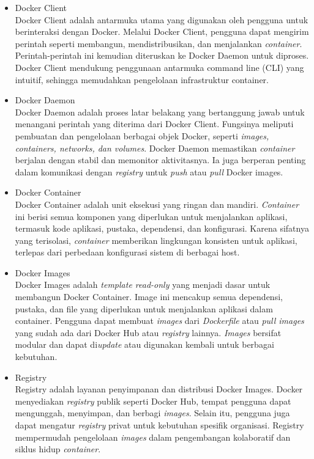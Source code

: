 \begin{itemize}[noitemsep, topsep=0pt]
\item Docker Client \\
Docker Client adalah antarmuka utama yang digunakan oleh pengguna untuk berinteraksi dengan Docker. Melalui Docker Client, pengguna dapat mengirim perintah seperti membangun, mendistribusikan, dan menjalankan \emph{container}. Perintah-perintah ini kemudian diteruskan ke Docker Daemon untuk diproses. Docker Client mendukung penggunaan antarmuka command line (CLI) yang intuitif, sehingga memudahkan pengelolaan infrastruktur container.

\item Docker Daemon \\
Docker Daemon adalah proses latar belakang yang bertanggung jawab untuk menangani perintah yang diterima dari Docker Client. Fungsinya meliputi pembuatan dan pengelolaan berbagai objek Docker, seperti \emph{images, containers, networks, dan volumes}. Docker Daemon memastikan \emph{container} berjalan dengan stabil dan memonitor aktivitasnya. Ia juga berperan penting dalam komunikasi dengan \emph{registry} untuk \emph{push} atau \emph{pull} Docker images.

\item Docker Container \\
Docker Container adalah unit eksekusi yang ringan dan mandiri. \emph{Container} ini berisi semua komponen yang diperlukan untuk menjalankan aplikasi, termasuk kode aplikasi, pustaka, dependensi, dan konfigurasi. Karena sifatnya yang terisolasi, \emph{container} memberikan lingkungan konsisten untuk aplikasi, terlepas dari perbedaan konfigurasi sistem di berbagai host.

\item Docker Images \\
Docker Images adalah \emph{template read-only} yang menjadi dasar untuk membangun Docker Container. Image ini mencakup semua dependensi, pustaka, dan file yang diperlukan untuk menjalankan aplikasi dalam container. Pengguna dapat membuat \emph{images} dari \emph{Dockerfile} atau \emph{pull images} yang sudah ada dari Docker Hub atau \emph{registry} lainnya. \emph{Images} bersifat modular dan dapat di\emph{update} atau digunakan kembali untuk berbagai kebutuhan.

\item Registry \\
Registry adalah layanan penyimpanan dan distribusi Docker Images. Docker menyediakan \emph{registry} publik seperti Docker Hub, tempat pengguna dapat mengunggah, menyimpan, dan berbagi \emph{images}. Selain itu, pengguna juga dapat mengatur \emph{registry} privat untuk kebutuhan spesifik organisasi. Registry mempermudah pengelolaan \emph{images} dalam pengembangan kolaboratif dan siklus hidup \emph{container}. 
\end{itemize}

